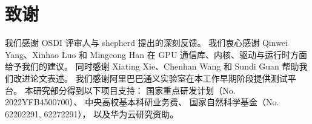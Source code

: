 \section*{致谢}
\noindent
我们感谢 OSDI 评审人与 shepherd 提出的深刻反馈。
我们衷心感谢 Qinwei Yang、Xinhao Luo 和 Mingcong Han
在 GPU 通信库、内核、驱动与运行时方面给予我们的建议。
同时感谢 Xiating Xie、Chenhan Wang 和 Sundi Guan
帮助我们改进论文表述。
我们感谢阿里巴巴通义实验室在本工作早期阶段提供测试平台。
本研究部分得到以下项目支持：
国家重点研发计划（No. 2022YFB4500700）、
中央高校基本科研业务费、
国家自然科学基金（No. 62202291, 62272291），
以及华为云研究资助。

